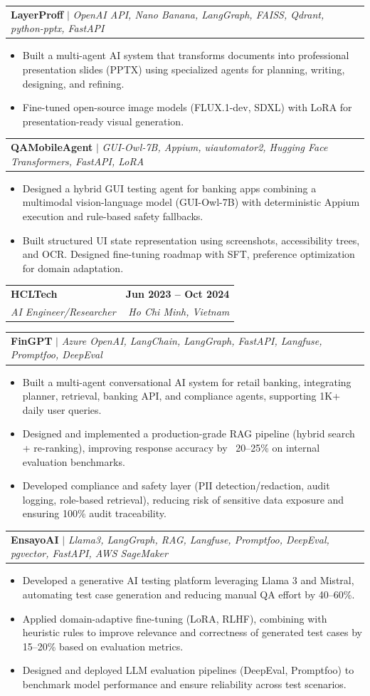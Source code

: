 \documentclass[letterpaper,11pt]{article}
\makeatletter
\newcommand{\resumeItem}[1]{
  \item\small{
    {#1 \vspace{-2pt}}
  }
}
\newcommand{\resumeSubheading}[4]{
  \vspace{-2pt}\item
    \begin{tabular*}{1.0\textwidth}[t]{l@{\extracolsep{\fill}}r}
      \textbf{#1} & \textbf{\small #2} \\
      \textit{\small#3} & \textit{\small #4} \\
    \end{tabular*}\vspace{-7pt}
}
\newcommand{\resumeProjectHeading}[2]{
    \item
    \begin{tabular*}{0.97\textwidth}{l@{\extracolsep{\fill}}r}
      \footnotesize#1 & \textbf{\footnotesize #2}\\
    \end{tabular*}\vspace{-7pt}
}
\newcommand{\resumeItemListStart}{\begin{itemize}}
\newcommand{\resumeItemListEnd}{\end{itemize}\vspace{-5pt}}
\makeatother
\begin{document}
      \resumeProjectHeading
          {\textbf{LayerProff} $|$ \emph{OpenAI API, Nano Banana, LangGraph, FAISS, Qdrant, python-pptx, FastAPI}}{}
          \resumeItemListStart
            \resumeItem{Built a multi-agent AI system that transforms documents into professional presentation slides (PPTX) using specialized agents for planning, writing, designing, and refining.}
            \resumeItem{Fine-tuned open-source image models (FLUX.1-dev, SDXL) with LoRA for presentation-ready visual generation.}
          \resumeItemListEnd

      \resumeProjectHeading
          {\textbf{QAMobileAgent} $|$ \emph{GUI-Owl-7B, Appium, uiautomator2, Hugging Face Transformers, FastAPI, LoRA}}{}
          \resumeItemListStart
            \resumeItem{Designed a hybrid GUI testing agent for banking apps combining a multimodal vision-language model (GUI-Owl-7B) with deterministic Appium execution and rule-based safety fallbacks.}
            \resumeItem{Built structured UI state representation using screenshots, accessibility trees, and OCR. Designed fine-tuning roadmap with SFT, preference optimization for domain adaptation.}
          \resumeItemListEnd

    \resumeSubheading
      {HCLTech}{Jun 2023 -- Oct 2024}
      {AI Engineer/Researcher}{Ho Chi Minh, Vietnam}

      \resumeProjectHeading
          {\textbf{FinGPT} $|$ \emph{Azure OpenAI, LangChain, LangGraph, FastAPI, Langfuse, Promptfoo, DeepEval}}{}
          \resumeItemListStart
            \resumeItem{Built a multi-agent conversational AI system for retail banking, integrating planner, retrieval, banking API, and compliance agents, supporting 1K+ daily user queries.}
            \resumeItem{Designed and implemented a production-grade RAG pipeline (hybrid search + re-ranking), improving response accuracy by ~20–25\% on internal evaluation benchmarks.}
            \resumeItem{Developed compliance and safety layer (PII detection/redaction, audit logging, role-based retrieval), reducing risk of sensitive data exposure and ensuring 100\% audit traceability.}
          \resumeItemListEnd

      \resumeProjectHeading
          {\textbf{EnsayoAI} $|$ \emph{Llama3, LangGraph, RAG, Langfuse, Promptfoo, DeepEval, pgvector, FastAPI, AWS SageMaker}}{}
          \resumeItemListStart
            \resumeItem{Developed a generative AI testing platform leveraging Llama 3 and Mistral, automating test case generation and reducing manual QA effort by 40–60\%.}
            \resumeItem{Applied domain-adaptive fine-tuning (LoRA, RLHF), combining with heuristic rules to improve relevance and correctness of generated test cases by 15–20\% based on evaluation metrics.}
            \resumeItem{Designed and deployed LLM evaluation pipelines (DeepEval, Promptfoo) to benchmark model performance and ensure reliability across test scenarios.}
          \resumeItemListEnd
\end{document}
